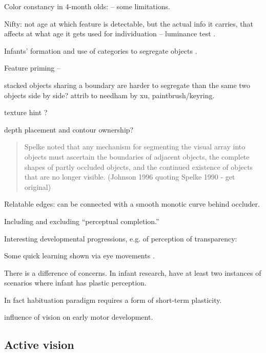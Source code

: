 Color constancy in 4-month olds: \cite{dannemiller87test} -- some 
limitations.

Nifty: not age at which feature is detectable, but the actual
info it carries, that affects at what age it gets used for
individuation -- luminance test \cite{woods05infants}.

Infants' formation and use of categories to segregate objects 
\cite{needham05infants}.

Feature priming -- \cite{wilcox04priming}


stacked objects sharing a boundary are harder
to segregate than the same two objects
side by side?  attrib to needham by xu,
paintbrush/keyring.


texture hint \cite{johnson96perception}?

depth placement and contour ownership?

\begin{quote}

Spelke noted that any mechanism for segmenting the visual array
into objects must ascertain the boundaries of adjacent objects,
the complete shapes of partly occluded objects, and the continued
existence of objects that are no longer visible.
(Johnson 1996 quoting Spelke 1990 - get original)

\end{quote}

Relatable edges: can be connected with a smooth monotic
curve behind occluder.

Including and excluding ``perceptual completion.''

Interesting developmental progressions, e.g. of perception
of transparency: \cite{johnson00infants}


Some quick learning shown via eye movements \cite{johnson03development}.


There is a difference of concerns.  In infant research, have
at least two instances of scenarios where infant has
plastic perception.

In fact habituation paradigm requires a form of short-term
plasticity. 


\cite{prechtl01role} influence of vision on early motor 
development.

\subsection{Active vision}

\cite{bajcsy88active,aloimonos87active,ballard91animate}

